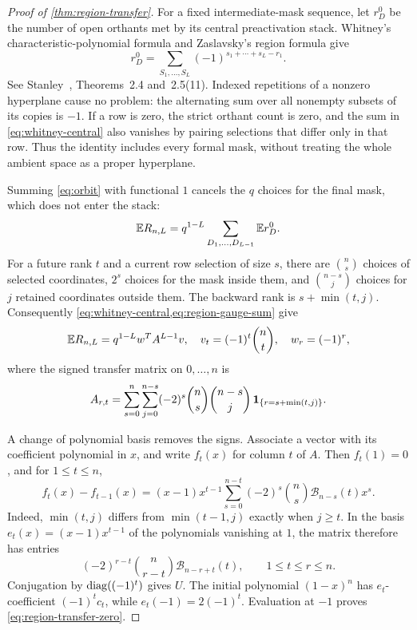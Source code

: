 \begin{proof}[Proof of \cref{thm:region-transfer}]
For a fixed intermediate-mask sequence, let $r_D^0$ be the number of open orthants met by its central preactivation stack. Whitney's characteristic-polynomial formula and Zaslavsky's region formula give
\begin{equation}\label{eq:whitney-central}
r_D^0=\sum_{S_1,\ldots,S_L}(-1)^{s_1+\cdots+s_L-r_1}.
\end{equation}
See Stanley~\cite{stanley}, Theorems~2.4 and~2.5(11). Indexed repetitions of a nonzero hyperplane cause no problem: the alternating sum over all nonempty subsets of its copies is $-1$. If a row is zero, the strict orthant count is zero, and the sum in \cref{eq:whitney-central} also vanishes by pairing selections that differ only in that row. Thus the identity includes every formal mask, without treating the whole ambient space as a proper hyperplane.

Summing \cref{eq:orbit} with functional $1$ cancels the $q$ choices for the final mask, which does not enter the stack:
\begin{equation}\label{eq:region-gauge-sum}
\mathbb{E} R_{n,L}=q^{1-L}\sum_{D_1,\ldots,D_{L-1}}\mathbb{E} r_D^0.
\end{equation}
For a future rank $t$ and a current row selection of size $s$, there are $\binom ns$ choices of selected coordinates, $2^s$ choices for the mask inside them, and $\binom{n-s}j$ choices for $j$ retained coordinates outside them. The backward rank is $s+\min(t,j)$. Consequently \cref{eq:whitney-central,eq:region-gauge-sum} give
\[
\mathbb{E} R_{n,L}=q^{1-L}w^T A^{L-1}v,
\quad v_t=(-1)^t\binom nt,\quad w_r=(-1)^r,
\]
where the signed transfer matrix on $0,\ldots,n$ is
\[
A_{r,t}=\sum_{s=0}^n\sum_{j=0}^{n-s}
(-2)^s\binom ns\binom{n-s}j\,
\mathbf{1}_{\{r=s+\min(t,j)\}}.
\]

A change of polynomial basis removes the signs. Associate a vector with its coefficient polynomial in $x$, and write $f_t(x)$ for column $t$ of $A$. Then $f_t(1)=0$, and for $1\le t\le n$,
\[
f_t(x)-f_{t-1}(x)
=(x-1)x^{t-1}\sum_{s=0}^{n-t}(-2)^s\binom ns
\mathcal B_{n-s}(t)x^s.
\]
Indeed, $\min(t,j)$ differs from $\min(t-1,j)$ exactly when $j\ge t$. In the basis $e_t(x)=(x-1)x^{t-1}$ of the polynomials vanishing at $1$, the matrix therefore has entries
\[
(-2)^{r-t}\binom n{r-t}\mathcal B_{n-r+t}(t),\qquad 1\le t\le r\le n.
\]
Conjugation by $\operatorname{diag}((-1)^t)$ gives $U$. The initial polynomial $(1-x)^n$ has $e_t$-coefficient $(-1)^tc_t$, while $e_t(-1)=2(-1)^t$. Evaluation at $-1$ proves \cref{eq:region-transfer-zero}.


\end{proof}
